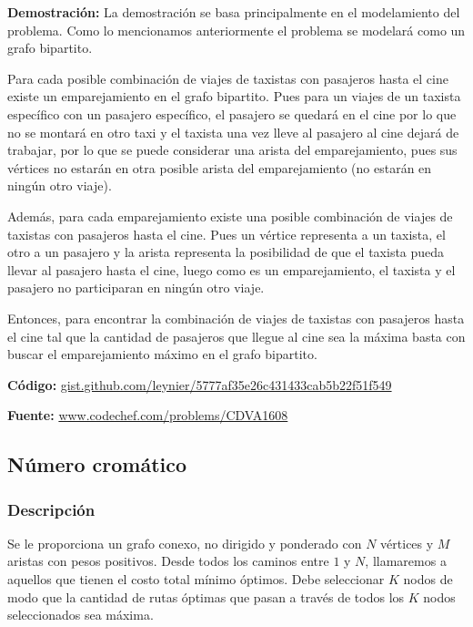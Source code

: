 \documentclass[12pt]{article}
\newcommand{\nl}{\vspace{0.3cm}}
\begin{document}
\textbf{Demostración:} La demostración se basa principalmente en el modelamiento del problema. Como lo mencionamos anteriormente el problema se modelará como un grafo bipartito.

\nl

Para cada posible combinación de viajes de taxistas con pasajeros hasta el cine existe un emparejamiento en el grafo bipartito. Pues para un viajes de un taxista específico con un pasajero específico, el pasajero se quedará en el cine por lo que no se montará en otro taxi y el taxista una vez lleve al pasajero al cine dejará de trabajar, por lo que se puede considerar una arista del emparejamiento, pues sus vértices no estarán en otra posible arista del emparejamiento (no estarán en ningún otro viaje).

\nl

Además, para cada emparejamiento existe una posible combinación de viajes de taxistas con pasajeros hasta el cine. Pues un vértice representa a un taxista, el otro a un pasajero y la arista representa la posibilidad de que el taxista pueda llevar al pasajero hasta el cine, luego como es un emparejamiento, el taxista y el pasajero no participaran en ningún otro viaje.

\nl

Entonces, para encontrar la combinación de viajes de taxistas con pasajeros hasta el cine tal que la cantidad de pasajeros que llegue al cine sea la máxima basta con buscar el emparejamiento máximo en el grafo bipartito.

\nl

\textbf{Código:} \href{https://gist.github.com/leynier/5777af35e26c431433cab5b22f51f549}{gist.github.com/leynier/5777af35e26c431433cab5b22f51f549}

\nl

\textbf{Fuente:} \href{https://www.codechef.com/problems/CDVA1608}{www.codechef.com/problems/CDVA1608}

\subsection{Número cromático}

\subsubsection{Descripción}

Se le proporciona un grafo conexo, no dirigido y ponderado con $N$ vértices y $M$ aristas con pesos positivos. Desde todos los caminos entre $1$ y $N$, llamaremos a aquellos que tienen el costo total mínimo óptimos. Debe seleccionar $K$ nodos de modo que la cantidad de rutas óptimas que pasan a través de todos los $K$ nodos seleccionados sea máxima.
\end{document}
